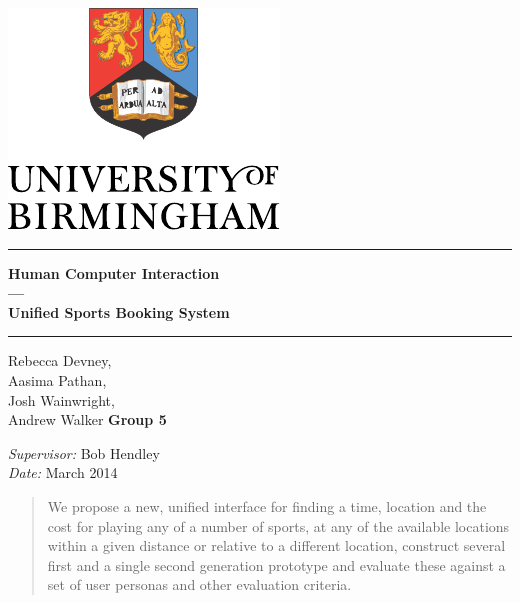 \begin{titlepage}
	\begin{center}
	\vspace*{\fill}

	\centering
	\includegraphics[scale=1.0]{Logo.pdf}
	\vfill

	\hrule
	{\LARGE\bf Human Computer Interaction \\
		--- \\
		Unified Sports Booking System\\[0.4cm]}
	\hrule

	\vfill

	\vfill
		Rebecca Devney,\\
		Aasima Pathan,\\
		Josh Wainwright,\\
		Andrew Walker
	\vfill
		\textbf{Group 5}
	\vfill

	\vfill
	\textit{Supervisor:} Bob Hendley \\
	\vfill
	\textit{Date:} March 2014
	\vfill
	\vfill

	\begin{abstract}
		We propose a new, unified interface for finding a time, location and
		the cost for playing any of a number of sports, at any of the
		available locations within a given distance or relative to a different
		location, construct several first and a single second generation
		prototype and evaluate these against a set of user personas and other
		evaluation criteria.
	\end{abstract}

	\end{center}
\end{titlepage}


